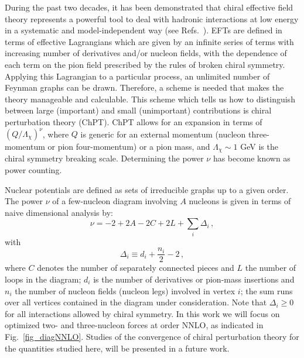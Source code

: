 \documentclass[aps,showpacs,floatfix,nofootinbib,preprintnumbers,superscriptaddress,amsmath,amssymb]{revtex4-1}
\begin{document}
During the past two decades, it has been demonstrated that chiral effective field theory represents 
a powerful tool to deal with hadronic interactions at low energy in a systematic and model-independent
way (see Refs.~\cite{weinberg1990,weinberg1991,ordonez1992,ordonez1994,ordonez1996,vankolck1999,machleidt2011,epelbaum2009,ekstrom2013}). 
EFTs are defined in terms of effective Lagrangians which
are given by an infinite series of terms with increasing number of derivatives
and/or nucleon fields, with the dependence of each term on the pion field 
prescribed by the rules of broken chiral symmetry.
Applying this Lagrangian to a particular process, an unlimited number of Feynman 
graphs can be drawn. Therefore,
a scheme is needed that makes the theory manageable and calculable.
This scheme
which tells us how to distinguish between large
(important) and small (unimportant) contributions
is chiral perturbation theory (ChPT).
ChPT allows for an expansion in terms of $(Q/\Lambda_\chi)^\nu$,
where $Q$ is generic for an external momentum (nucleon three-momentum
or pion four-momentum) or a pion mass, and $\Lambda_\chi \sim 1$ GeV is the chiral symmetry breaking scale.
Determining the power $\nu$ 
has become known as power counting.

Nuclear potentials are defined as sets of irreducible
graphs up to a given order.
The power $\nu$ of a few-nucleon diagram involving $A$ nucleons
is given in terms of naive dimensional analysis by:
\begin{equation} 
\nu = -2 +2A - 2C + 2L 
+ \sum_i \Delta_i \, ,  
\label{eq_nu} 
\end{equation}
with
\begin{equation}
\Delta_i  \equiv   d_i + \frac{n_i}{2} - 2  \, ,
\label{eq_Deltai}
\end{equation}
where $C$ denotes the number of separately connected pieces and
$L$ the number of loops in the diagram;
$d_i$ is the number of derivatives or pion-mass insertions and $n_i$ the number of nucleon fields 
(nucleon legs) involved in vertex $i$; the sum runs over all vertices contained
in the diagram under consideration.
Note that $\Delta_i \geq 0$
for all interactions allowed by chiral symmetry.   In this work we will focus on optimized two- and three-nucleon forces  at order 
NNLO, as indicated in Fig.~\ref{fig_diagNNLO}.   Studies of the convergence of chiral perturbation theory for the quantities studied here, will be
presented in  a future work.  
\end{document}
